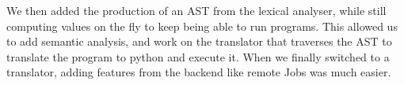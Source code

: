 We then added the production of an AST from the lexical analyser, while still computing values on the fly to keep being able to run programs.
This allowed us to add semantic analysis, and work on the translator that traverses the AST to translate the program to python and execute it.
When we finally switched to a translator, adding features from the backend like remote Jobs was much easier.
